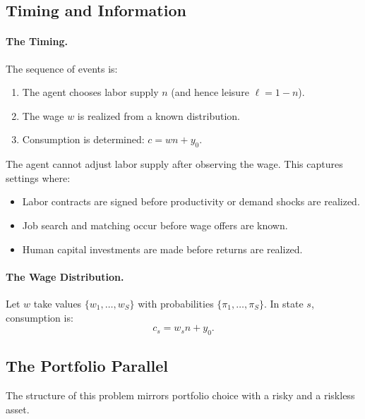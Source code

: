 \subsection{Timing and Information}
\label{subsec:timing}

\paragraph{The Timing.}
The sequence of events is:
\begin{enumerate}[leftmargin=2em]
\item The agent chooses labor supply $n$ (and hence leisure $\ell = 1 - n$).
\item The wage $w$ is realized from a known distribution.
\item Consumption is determined: $c = wn + y_0$.
\end{enumerate}

The agent cannot adjust labor supply after observing the wage. This captures settings where:
\begin{itemize}[leftmargin=2em]
\item Labor contracts are signed before productivity or demand shocks are realized.
\item Job search and matching occur before wage offers are known.
\item Human capital investments are made before returns are realized.
\end{itemize}

\paragraph{The Wage Distribution.}
Let $w$ take values $\{w_1, \ldots, w_S\}$ with probabilities $\{\pi_1, \ldots, \pi_S\}$. In state $s$, consumption is:
\begin{equation}
c_s = w_s n + y_0.
\label{eq:consumption-state}
\end{equation}

\subsection{The Portfolio Parallel}
\label{subsec:portfolio-parallel}

The structure of this problem mirrors portfolio choice with a risky and a riskless asset.

